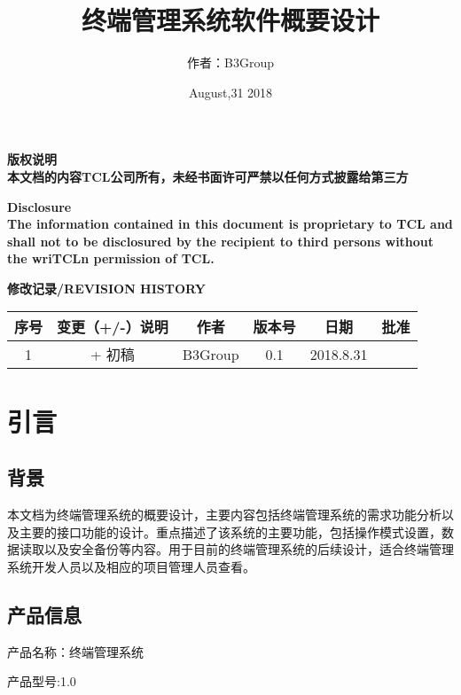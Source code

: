 \documentclass[UTF8]{ctexart}
\title{终端管理系统软件概要设计}
\author{作者：B3Group}
\date{August,31 2018}
\newcommand{\note}[1]{\textcolor{blue}{\emph{[#1]}}}   %
\newcommand{\pnote}[1]{\par{\textcolor{blue}{\emph{[#1]}}}}   %
\begin{document}
\maketitle
\thispagestyle{empty}
\newpage%
\setcounter{page}{1}
\begin{center}
 \vspace{20ex}
 \par{\textbf{版权说明\\本文档的内容TCL公司所有，未经书面许可严禁以任何方式披露给第三方}}
 \par{\textbf{Disclosure\\The information contained in this document is proprietary to TCL and shall
      not to be disclosured by the recipient to third persons without the wriTCLn permission of TCL.}}
 \vspace{2ex}
 \par{\textbf{修改记录/REVISION HISTORY}}
 \vspace{2ex}
 \par{}
 \begin{tabular}{|c|c|c|c|c|c|}
   \hline
    序号 & 变更（+/-）说明 & 作者 & 版本号 & 日期 & 批准 \\
    \hline
    1 & + 初稿 & B3Group & 0.1 & 2018.8.31 &\\
    \hline
  \end{tabular}
\end{center}
 \newpage
 \tableofcontents%
 
 \newpage
 \section{引言} %
   \subsection{背景}
	\par{本文档为终端管理系统的概要设计，主要内容包括终端管理系统的需求功能分析以及主要的接口功能的设计。重点描述了该系统的主要功能，包括操作模式设置，数据读取以及安全备份等内容。用于目前的终端管理系统的后续设计，适合终端管理系统开发人员以及相应的项目管理人员查看。}
    \subsection{产品信息}产品名称：终端管理系统
     \par{产品型号:}1.0
\end{document}
